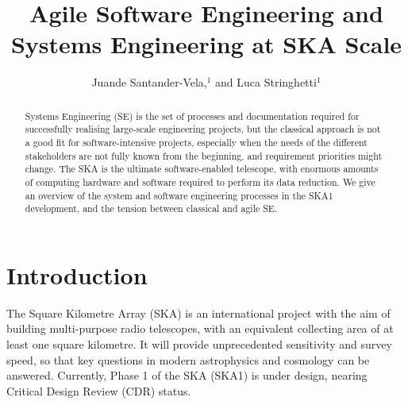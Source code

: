 \documentclass[11pt,twoside]{article}
\begin{document}
\title{Agile Software Engineering and Systems Engineering at SKA Scale}

\author{Juande Santander-Vela,$^1$ and Luca Stringhetti$^1$
}


\begin{abstract}
Systems Engineering (SE) is the set of processes and documentation required for successfully realising large-scale engineering projects, but the classical approach is not a good fit for software-intensive projects, especially when the needs of the different stakeholders are not fully known from the beginning, and requirement priorities might change. The SKA is the ultimate software-enabled telescope, with enormous amounts of computing hardware and software required to perform its data reduction. We give an overview of the system and software engineering processes in the SKA1 development, and the tension between classical and agile SE.
\end{abstract}


\section{Introduction} %
\label{sec:introduction}
The Square Kilometre Array (SKA) is an international project with the aim of building multi-purpose radio telescopes, with an equivalent collecting area of at least one square kilometre. It will provide unprecedented sensitivity and survey speed, so that key questions in modern astrophysics and cosmology can be answered. Currently, Phase 1 of the SKA (SKA1) is under design, nearing Critical Design Review (CDR) status.	
\end{document}
